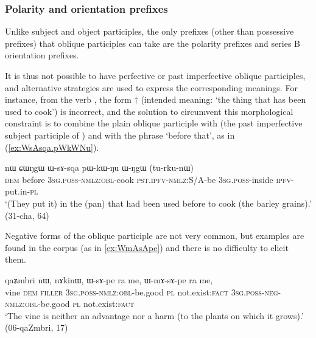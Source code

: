 \subsubsection{Polarity and orientation prefixes} \label{sec:oblique.participle.orientation}
Unlike subject and object participles, the only prefixes (other than possessive prefixes) that oblique participles can take are the polarity prefixes and series B orientation prefixes.

It is thus not possible to have perfective or past imperfective oblique participles, and alternative strategies are used to express the corresponding meanings. For instance, from the verb , the form $\dagger$ (intended meaning: `the thing that has been used to cook') is incorrect, and the solution to circumvent this morphological constraint is to combine the plain oblique participle  with  (the past imperfective subject participle of ) and with the phrase  `before that', as in (\ref{ex:WsAsqa.pWkWNu}).

\begin{exe}
\ex \label{ex:WsAsqa.pWkWNu}
\gll  nɯ ɕɯŋgɯ ɯ-sɤ-sqa pɯ-kɯ-ŋu ɯ-ŋgɯ (tu-rku-nɯ) \\
\textsc{dem} before \textsc{3sg}.\textsc{poss}-\textsc{nmlz}:\textsc{obl}-cook \textsc{pst}.\textsc{ipfv}-\textsc{nmlz}:S/A-be \textsc{3sg}.\textsc{poss}-inside \textsc{ipfv}-put.in-\textsc{pl} \\
\glt `(They put it) in the (pan) that had been used before to cook (the barley grains).' (31-cha, 64)
\end{exe}

Negative forms of the oblique participle are not very common, but examples are found in the corpus (as in \ref{ex:WmAsApe}) and there is no difficulty to elicit them.

\begin{exe}
\ex \label{ex:WmAsApe}
\gll  qaʑmbri nɯ, nɤkinɯ, ɯ-sɤ-pe ra me, ɯ-mɤ-sɤ-pe ra me, \\
vine \textsc{dem} \textsc{filler} \textsc{3sg}.\textsc{poss}-\textsc{nmlz}:\textsc{obl}-be.good \textsc{pl} not.exist:\textsc{fact}  \textsc{3sg}.\textsc{poss}-\textsc{neg}-\textsc{nmlz}:\textsc{obl}-be.good \textsc{pl} not.exist:\textsc{fact} \\
\glt `The vine is neither an advantage nor a harm (to the plants on which it grows).' (06-qaZmbri, 17)
\end{exe}


